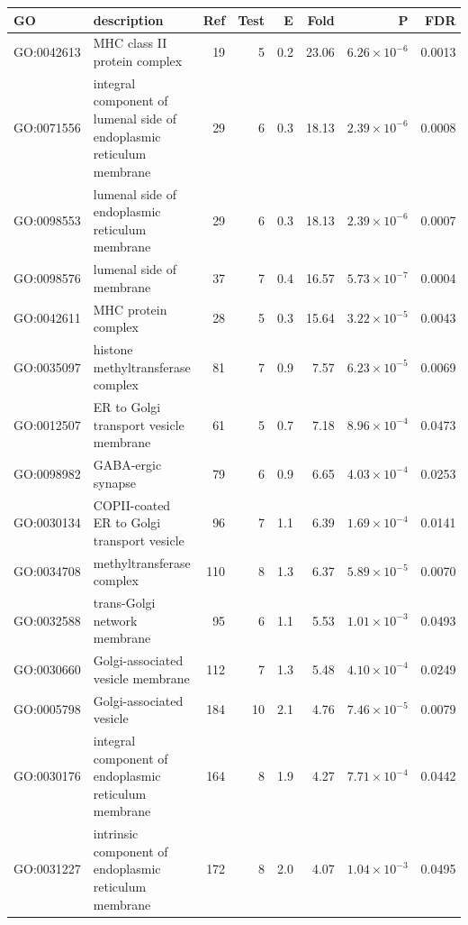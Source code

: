             
\begin{table}[ht]
\centering
\begin{adjustbox}{width=\textwidth}

\begin{tabular}{llrrrrrr}
  \hline
GO & description & Ref & Test & E & Fold & P & FDR \\ 
  \hline
GO:0042613 & MHC class II protein complex  & 19 & 5 & 0.2 & 23.06 & $6.26 \times 10^{-6}$ & 0.0013 \\ 
  GO:0071556 & integral component of lumenal side of endoplasmic reticulum membrane  & 29 & 6 & 0.3 & 18.13 & $2.39 \times 10^{-6}$ & 0.0008 \\ 
  GO:0098553 & lumenal side of endoplasmic reticulum membrane  & 29 & 6 & 0.3 & 18.13 & $2.39 \times 10^{-6}$ & 0.0007 \\ 
  GO:0098576 & lumenal side of membrane  & 37 & 7 & 0.4 & 16.57 & $5.73 \times 10^{-7}$ & 0.0004 \\ 
  GO:0042611 & MHC protein complex  & 28 & 5 & 0.3 & 15.64 & $3.22 \times 10^{-5}$ & 0.0043 \\ 
  GO:0035097 & histone methyltransferase complex  & 81 & 7 & 0.9 & 7.57 & $6.23 \times 10^{-5}$ & 0.0069 \\ 
  GO:0012507 & ER to Golgi transport vesicle membrane  & 61 & 5 & 0.7 & 7.18 & $8.96 \times 10^{-4}$ & 0.0473 \\ 
  GO:0098982 & GABA-ergic synapse  & 79 & 6 & 0.9 & 6.65 & $4.03 \times 10^{-4}$ & 0.0253 \\ 
  GO:0030134 & COPII-coated ER to Golgi transport vesicle  & 96 & 7 & 1.1 & 6.39 & $1.69 \times 10^{-4}$ & 0.0141 \\ 
  GO:0034708 & methyltransferase complex  & 110 & 8 & 1.3 & 6.37 & $5.89 \times 10^{-5}$ & 0.0070 \\ 
  GO:0032588 & trans-Golgi network membrane  & 95 & 6 & 1.1 & 5.53 & $1.01 \times 10^{-3}$ & 0.0493 \\ 
  GO:0030660 & Golgi-associated vesicle membrane  & 112 & 7 & 1.3 & 5.48 & $4.10 \times 10^{-4}$ & 0.0249 \\ 
  GO:0005798 & Golgi-associated vesicle  & 184 & 10 & 2.1 & 4.76 & $7.46 \times 10^{-5}$ & 0.0079 \\ 
  GO:0030176 & integral component of endoplasmic reticulum membrane  & 164 & 8 & 1.9 & 4.27 & $7.71 \times 10^{-4}$ & 0.0442 \\ 
  GO:0031227 & intrinsic component of endoplasmic reticulum membrane  & 172 & 8 & 2.0 & 4.07 & $1.04 \times 10^{-3}$ & 0.0495 \\ 

\end{tabular}
\end{adjustbox}
\end{table}

